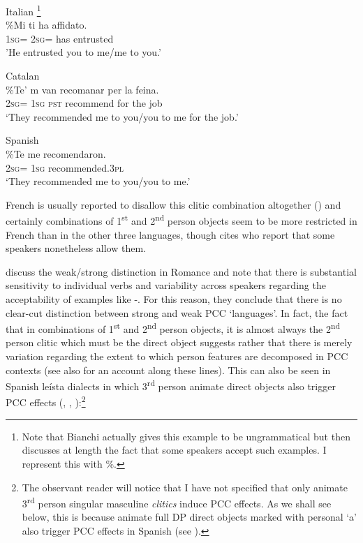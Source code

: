 \documentclass[output=paper,colorlinks,citecolor=brown,nonflat]{./langscibook}
\begin{document}
\ea%
    \label{ex:sheehan:5}
    Italian \citep[2027]{Bianchi2006}\footnote{Note that Bianchi actually gives this example to be ungrammatical but then discusses at length the fact that some speakers accept such examples. I represent this with \%.}\\
    \gll    \%Mi   ti     ha   affidato.\\
            \textsc{1sg=}   \textsc{2sg=}   has   entrusted\\
    \glt    'He entrusted you to me/me to you.’
\z

\ea%
    \label{ex:sheehan:6}
    Catalan \citep[179]{Bonet1991}\\
    \gll    \%Te’  m   van   recomanar   per   la   feina.\\
            \textsc{2sg=}  \textsc{1sg}   \textsc{pst}   recommend  for   the   job\\
    \glt    ‘They recommended me to you/you to me for the job.’
\z

\ea%
    \label{ex:sheehan:7}
    Spanish \citep[61]{Perlmutter1971}\\
    \gll    \%Te   me   recomendaron.\\
            \textsc{2sg=}  \textsc{1sg}   recommended.\textsc{3pl}\\
    \glt    ‘They recommended me to you/you to me.’
\z

French is usually reported to disallow this clitic combination altogether (\citealt{Kayne1975, Quicoli1984}) and certainly combinations of 1\textsuperscript{st} and 2\textsuperscript{nd} person objects seem to be more restricted in French than in the other three languages, though \citet[180]{Bonet1991} cites \citet{SimpsonWithgott1986} who report that some speakers nonetheless allow them. 

\citet{OrmazabalRomero2007} discuss the weak/strong distinction in Romance and note that there is substantial sensitivity to individual verbs and variability across speakers regarding the acceptability of examples like -. For this reason, they conclude that there is no clear-cut distinction between strong and weak PCC ‘languages’. In fact, the fact that in combinations of 1\textsuperscript{st} and 2\textsuperscript{nd} person objects, it is almost always the 2\textsuperscript{nd} person clitic which must be the direct object suggests rather that there is merely variation regarding the extent to which person features are decomposed in PCC contexts (see also \citealt{Anagnostopoulou2005} for an account along these lines). This can also be seen in Spanish leísta dialects in which 3\textsuperscript{rd} person animate direct objects also trigger PCC effects (\citealt{OrmazabalRomero2007}, \citeyear{OrmazabalRomero2010}, \citeyear{OrmazabalRomero2013Borealis}):\footnote{The observant reader will notice that I have not specified that only animate 3\textsuperscript{rd} person singular masculine \textit{clitics} induce PCC effects. As we shall see below, this is because animate full DP direct objects marked with personal ‘a’ also trigger PCC effects in Spanish (see \citealt{OrmazabalRomero2013Borealis}).} 
\end{document}
